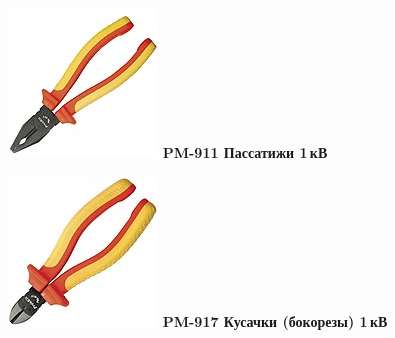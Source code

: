 {\begin{multicols}{2}
\noindent\includegraphics[width=\columnwidth]{00/fig/pros/PM-911.jpg}
\textbf{PM-911 Пассатижи 1\,кВ}

\noindent\includegraphics[width=\columnwidth]{00/fig/pros/PM-917.jpg}
\textbf{PM-917 Кусачки (бокорезы) 1\,кВ}
\end{multicols}

}
